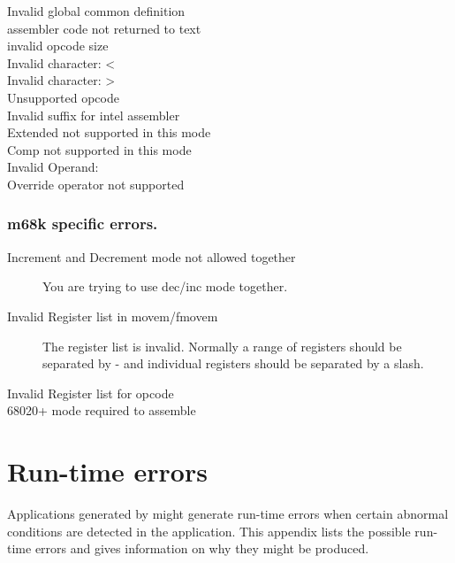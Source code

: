 \begin{description}
\item [ Invalid global common definition ]
\item [ assembler code not returned to text ]
\item [ invalid opcode size ]
\item [ Invalid character: < ]
\item [ Invalid character: > ]
\item [ Unsupported opcode ]
\item [ Invalid suffix for intel assembler ]
\item [ Extended not supported in this mode ]
\item [ Comp not supported in this mode ]
\item [ Invalid Operand: ]
\item [ Override operator not supported ]
\end{description}

\subsection{m68k specific errors.}
\begin{description}
\item [Increment and Decrement mode not allowed together]
You are trying to use dec/inc mode together.

\item [Invalid Register list in movem/fmovem]
The register list is invalid. Normally a range of registers should
be separated by - and individual registers should be separated by
a slash.
\item [Invalid Register list for opcode]
\item [68020+ mode required to assemble]
\end{description}

\chapter{Run-time errors}

Applications generated  by \fpc might generate run-time errors when certain 
abnormal conditions are detected in the application. This appendix lists the 
possible run-time errors and gives information on why they might be produced.

